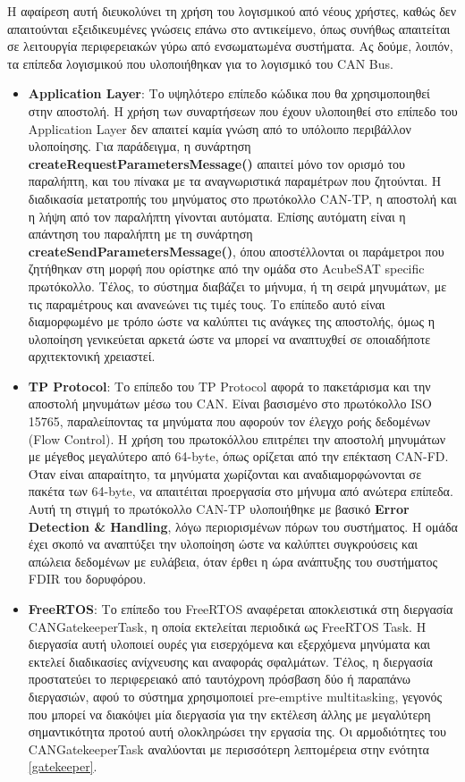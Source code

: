 \documentclass[a4paper,nobib,justified]{tufte-book}
\begin{document}
Η αφαίρεση αυτή διευκολύνει τη χρήση του λογισμικού από νέους χρήστες, καθώς δεν απαιτούνται εξειδικευμένες γνώσεις επάνω στο αντικείμενο, όπως συνήθως απαιτείται σε λειτουργία περιφερειακών γύρω από ενσωματωμένα συστήματα. Ας δούμε, λοιπόν, τα επίπεδα λογισμικού που υλοποιήθηκαν για το λογισμικό του CAN Bus.

\begin{itemize}
	\item \textbf{Application Layer}: Το υψηλότερο επίπεδο κώδικα που θα χρησιμοποιηθεί στην αποστολή. Η χρήση των συναρτήσεων που έχουν υλοποιηθεί στο επίπεδο του Application Layer δεν απαιτεί καμία γνώση από το υπόλοιπο περιβάλλον υλοποίησης. Για παράδειγμα, η συνάρτηση \textbf{createRequestParametersMessage()} απαιτεί μόνο τον ορισμό του παραλήπτη, και του πίνακα με τα αναγνωριστικά παραμέτρων που ζητούνται. Η διαδικασία μετατροπής του μηνύματος στο πρωτόκολλο CAN-TP, η αποστολή και η λήψη από τον παραλήπτη γίνονται αυτόματα. Επίσης αυτόματη είναι η απάντηση του παραλήπτη με τη συνάρτηση \textbf{createSendParametersMessage()}, όπου αποστέλλονται οι παράμετροι που ζητήθηκαν στη μορφή που ορίστηκε από την ομάδα στο AcubeSAT specific πρωτόκολλο. Τέλος, το σύστημα διαβάζει το μήνυμα, ή τη σειρά μηνυμάτων, με τις παραμέτρους και ανανεώνει τις τιμές τους. Το επίπεδο αυτό είναι διαμορφωμένο με τρόπο ώστε να καλύπτει τις ανάγκες της αποστολής, όμως η υλοποίηση γενικεύεται αρκετά ώστε να μπορεί να αναπτυχθεί σε οποιαδήποτε αρχιτεκτονική χρειαστεί.
	\item \textbf{TP Protocol}: Το επίπεδο του TP Protocol αφορά το πακετάρισμα και την αποστολή μηνυμάτων μέσω του CAN. Είναι βασισμένο στο πρωτόκολλο ISO 15765, παραλείποντας τα μηνύματα που αφορούν τον έλεγχο ροής δεδομένων (Flow Control). Η χρήση του πρωτοκόλλου επιτρέπει την αποστολή μηνυμάτων με μέγεθος μεγαλύτερο από 64-byte, όπως ορίζεται από την επέκταση CAN-FD. Όταν είναι απαραίτητο, τα μηνύματα χωρίζονται και αναδιαμορφώνονται σε πακέτα των 64-byte, να απαιτέιται προεργασία στο μήνυμα από ανώτερα επίπεδα. Αυτή τη στιγμή το πρωτόκολλο CAN-TP υλοποιήθηκε με βασικό \textbf{Error Detection \& Handling}, λόγω περιορισμένων πόρων του συστήματος. Η ομάδα έχει σκοπό να αναπτύξει την υλοποίηση ώστε να καλύπτει συγκρούσεις και απώλεια δεδομένων με ευλάβεια, όταν έρθει η ώρα ανάπτυξης του συστήματος FDIR του δορυφόρου.
	\item \textbf{FreeRTOS}: Το επίπεδο του FreeRTOS αναφέρεται αποκλειστικά στη διεργασία CANGatekeeperTask, η οποία εκτελείται περιοδικά ως FreeRTOS Task. Η διεργασία αυτή υλοποιεί ουρές για εισερχόμενα και εξερχόμενα μηνύματα και εκτελεί διαδικασίες ανίχνευσης και αναφοράς σφαλμάτων. Τέλος, η διεργασία προστατεύει το περιφερειακό από ταυτόχρονη πρόσβαση δύο ή παραπάνω διεργασιών, αφού το σύστημα χρησιμοποιεί pre-emptive multitasking, γεγονός που μπορεί να διακόψει μία διεργασία για την εκτέλεση άλλης με μεγαλύτερη σημαντικότητα προτού αυτή ολοκληρώσει την εργασία της. Οι αρμοδιότητες του CANGatekeeperTask αναλύονται με περισσότερη λεπτομέρεια στην ενότητα \ref{gatekeeper}.

\end{itemize}
\end{document}
